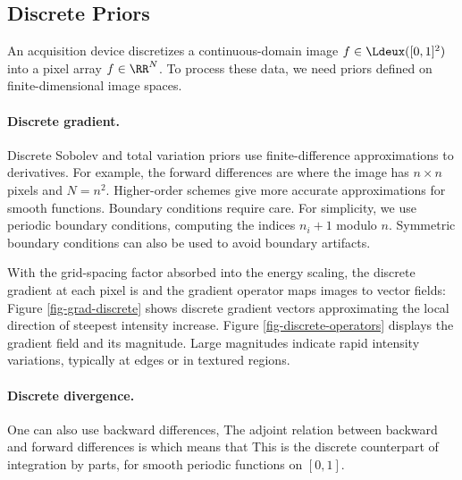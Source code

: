                                                                       
\subsection{Discrete Priors}
\label{subsec-disc-priors}

An acquisition device discretizes a continuous-domain image $f \in \Ldeux([0,1]^2)$ into a pixel array $f \in \RR^N$. To process these data, we need priors defined on finite-dimensional image spaces.

  
\paragraph{Discrete gradient.}

Discrete Sobolev and total variation priors use finite-difference approximations to derivatives. For example, the forward differences are
where the image has $n\times n$ pixels and $N=n^2$. Higher-order schemes give more accurate approximations for smooth functions.
Boundary conditions require care. For simplicity, we use periodic boundary conditions, computing the indices $n_i+1$ modulo $n$. Symmetric boundary conditions can also be used to avoid boundary artifacts.

With the grid-spacing factor absorbed into the energy scaling, the discrete gradient at each pixel is
and the gradient operator maps images to vector fields:
Figure \ref{fig-grad-discrete} shows discrete gradient vectors approximating the local direction of steepest intensity increase. Figure \ref{fig-discrete-operators} displays the gradient field and its magnitude. Large magnitudes indicate rapid intensity variations, typically at edges or in textured regions.


\paragraph{Discrete divergence.}

One can also use backward differences,
The adjoint relation between backward and forward differences is
which means that
This is the discrete counterpart of integration by parts,
for smooth periodic functions on $[0,1]$.

